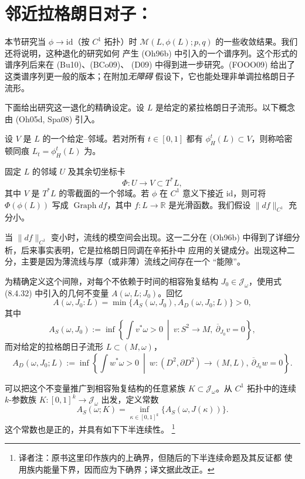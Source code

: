 \section{邻近拉格朗日对子：\termThickThinDichotomy{}}
\label{sec:nearby-lagrangian-thick-thin}

本节研究当 $\phi\to\mathrm{id}$（按 $C^1$ 拓扑）时
$\mathcal M(L,\phi(L);p,q)$ 的一些收敛结果。我们还将说明，这种退化的研究如何
产生 (Oh96b) 中引入的一个谱序列。这个形式的谱序列后来在 (Bu10)、(BCo09)、
(D09) 中得到进一步研究。(FOOO09) 给出了这类谱序列更一般的版本；在附加\emph{无障碍}
假设下，它也能处理非单调拉格朗日子流形。

下面给出研究这一退化的精确设定。设 $L$ 是给定的紧拉格朗日子流形。以下概念由
(Oh05d, Spa08) 引入。

\begin{definition}
\label{def:v-engulfed-isotopy}
设 $V$ 是 $L$ 的一个给定\personDarboux{}--\personWeinstein{}邻域。若对所有
$t\in[0,1]$ 都有 $\phi_H^t(L)\subset V$，则称哈密顿同痕
$L_t=\phi_H^t(L)$ 为\termVEngulfedHamiltonianIsotopy{}。
\end{definition}

固定 $L$ 的\personDarboux{}邻域 $U$ 及其余切坐标卡
\[
  \Phi:U\longrightarrow V\subset T^*L,
\]
其中 $V$ 是 $T^*L$ 的零截面的一个邻域。若 $\phi$ 在 $C^1$ 意义下接近
$\mathrm{id}$，则可将 $\Phi(\phi(L))$ 写成 $\operatorname{Graph}df$，其中
$f:L\to\mathbb R$ 是光滑函数。我们假设 $\|df\|_{C^1}$ 充分小。

当 $\|df\|_{C^1}$ 变小时，\personFloer{}流线的模空间会出现\termThickThinDichotomy{}。这一二分在
(Oh96b) 中得到了详细分析，后来事实表明，它是拉格朗日\personFloer{}同调在辛拓扑中
应用的关键成分。出现这种二分，主要是因为薄流线与厚（或非薄）流线之间存在一个
“能隙”。

为精确定义这个间隙，对每个不依赖于时间的相容殆复结构
$J_0\in\mathcal J_\omega$，使用式 (8.4.32) 中引入的几何不变量
$A(\omega,L;J_0)$。回忆
\[
 A(\omega,J_0:L)=\min\{A_S(\omega,J_0),A_D(\omega,J_0;L)\}>0,
\]
其中
\[
 A_S(\omega,J_0):=\inf\left\{\int v^*\omega>0\ \middle|\
 v:S^2\to M,\ \overline\partial_{J_0}v=0\right\},
\]
而对给定的拉格朗日子流形 $L\subset(M,\omega)$，
\[
 A_D(\omega,J_0;L):=\inf\left\{\int w^*\omega>0\ \middle|\
 w:(D^2,\partial D^2)\to(M,L),\ \overline\partial_{J_0}w=0\right\}.
\]

可以把这个不变量推广到相容殆复结构的任意紧族
$K\subset\mathcal J_\omega$。从 $C^1$ 拓扑中的连续 $k$-参数族
$K:[0,1]^k\to\mathcal J_\omega$ 出发，定义常数
\[
 A_S(\omega;K)=\inf_{\kappa\in[0,1]^k}\{A_S(\omega,J(\kappa))\}.
\]
这个常数也是正的，并具有如下下半连续性。
\footnote{译者注：原书这里印作族内的上确界，但随后的下半连续命题及其反证都
使用族内能量下界，因而应为下确界；译文据此改正。}

